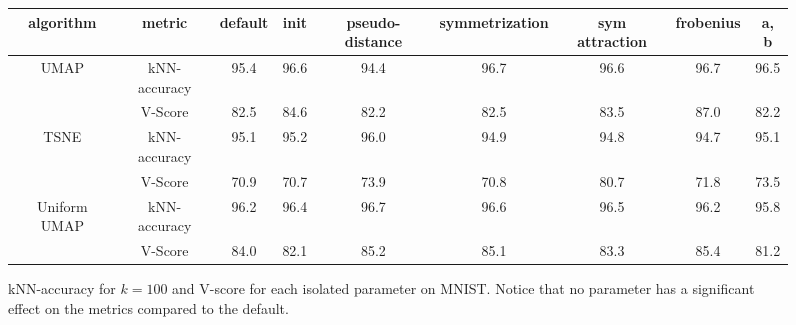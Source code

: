 \documentclass[sigconf, nonacm]{acmart}
\newcommand\ourmethod{Uniform UMAP }
\begin{document}
\begin{figure*}
    \centering
    \begin{tabular}{|c|c|c|c|c|c|c|c|c|}
    \hline
    algorithm & metric & default & init & pseudo-distance & symmetrization & sym attraction & frobenius & a, b \\
    \hline

    \multirow{2}{*}{UMAP} & kNN-accuracy & 95.4 & 96.6 & 94.4 & 96.7 & 96.6 & 96.7 & 96.5 \\ \cline{2-9}
                          & V-Score & 82.5 & 84.6 & 82.2 & 82.5 & 83.5 & 87.0 & 82.2 \\
    \hline

    \multirow{2}{*}{TSNE} & kNN-accuracy & 95.1 & 95.2 & 96.0 & 94.9 & 94.8 & 94.7 & 95.1 \\ \cline{2-9}
                          & V-Score & 70.9 & 70.7 & 73.9 & 70.8 & 80.7 & 71.8 & 73.5 \\
    \hline

    \multirow{2}{*}{\ourmethod} & kNN-accuracy & 96.2 & 96.4 & 96.7 & 96.6 & 96.5 & 96.2 & 95.8 \\ \cline{2-9}
                                & V-Score & 84.0 & 82.1 & 85.2 & 85.1 & 83.3 & 85.4 & 81.2 \\
    \hline
    \end{tabular}
    \caption{kNN-accuracy for $k=100$ and V-score for each isolated parameter on MNIST. Notice that no parameter has a significant effect on the metrics
    compared to the default.}
    \label{irrelevant-metrics}
\end{figure*}



\end{document}

